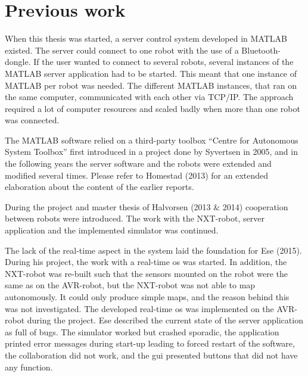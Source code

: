 \section{Previous work}
When this thesis was started, a server control system developed in MATLAB existed. The server could connect to one robot with the use of a Bluetooth-dongle. If the user wanted to connect to several robots, several instances of the MATLAB server application had to be started. This meant that one instance of MATLAB per robot was needed. The different MATLAB instances, that ran on the same computer, communicated with each other via TCP/IP. The approach required a lot of computer resources and scaled badly when more than one robot was connected.

The MATLAB software relied on a third-party toolbox ``Centre for Autonomous System Toolbox'' first introduced in a project done by Syvertsen in 2005, and in the following years the server software and the robots were extended and modified several times. Please refer to Homestad (2013) for an extended elaboration about the content of the earlier reports.

During the project and master thesis of Halvorsen (2013 \& 2014) cooperation between robots were introduced. The work with the NXT-robot, server application and the implemented simulator was continued.

The lack of the real-time aspect in the system laid the foundation for Ese (2015). During his project, the work with a real-time \acrshort{os} was started. In addition, the NXT-robot was re-built such that the sensors mounted on the robot were the same as on the AVR-robot, but the NXT-robot was not able to map autonomously. It could only produce simple maps, and the reason behind this was not investigated. The developed real-time \acrshort{os} was implemented on the AVR-robot during the project. Ese described the current state of the server application as full of bugs. The simulator worked but crashed sporadic, the application printed error messages during start-up leading to forced restart of the software, the collaboration did not work, and the \acrshort{gui} presented buttons that did not have any function.